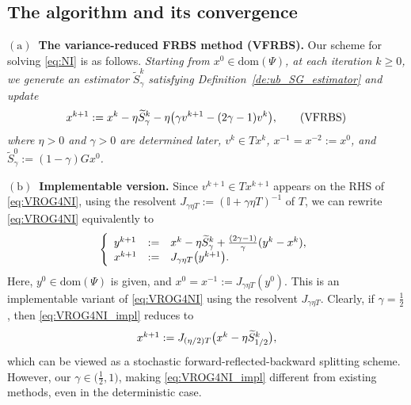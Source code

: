 \documentclass{article}
\newcommand{\Id}{\mathbb{I}}
\newcommand{\dom}[1]{\mathrm{dom}(#1)}
\newcommand{\aftersubsec}{\vspace{-1.5ex}}
\theoremstyle{plain}
\theoremstyle{definition}
\theoremstyle{remark}
\begin{document}
\subsection{The algorithm and its convergence}\label{subsec:VROG4NI_alg_convergence}
\aftersubsec
\vspace{0.5ex}
\textbf{$\mathrm{(a)}$~The variance-reduced FRBS method (VFRBS).}
Our scheme for solving \eqref{eq:NI} is as follows.
\textit{
Starting from $x^0 \in \dom{\Psi}$,  at each iteration $k \geq 0$, we generate an estimator $\widetilde{S}_{\gamma}^k$ satisfying Definition~\ref{de:ub_SG_estimator} and update
\vspace{-0.5ex}
\begin{equation}\label{eq:VROG4NI}
x^{k+1} :=  x^k - \eta  \widetilde{S}_{\gamma}^k - \eta \big( \gamma v^{k+1} - (2\gamma - 1)v^k \big),
\tag{VFRBS}
\vspace{-0.5ex}
\end{equation}
where $\eta > 0$ and $\gamma > 0$  are determined later, $v^k \in Tx^k$,  $x^{-1} = x^{-2} := x^0$, and $\widetilde{S}_{\gamma}^0 := (1-\gamma)Gx^0$.
}

\textbf{$\mathrm{(b)}$~Implementable version.}
Since $v^{k+1} \in Tx^{k+1}$ appears on the RHS of \eqref{eq:VROG4NI}, using the resolvent  $J_{\gamma\eta T} := (\Id + \gamma\eta T)^{-1}$ of $T$, we can rewrite \eqref{eq:VROG4NI} equivalently to  
\vspace{-1ex}
\begin{equation}\label{eq:VROG4NI_impl}
\left\{\begin{array}{lcl}
y^{k+1} &:= & x^k - \eta  \widetilde{S}_{\gamma}^k + \frac{(2\gamma - 1)}{\gamma}(y^k - x^k), \\
x^{k+1} &:= &  J_{\gamma\eta T}\big( y^{k+1}\big). 
\end{array}\right.
\vspace{-1ex}
\end{equation}
Here, $y^0 \in \dom{\Psi}$ is given, and $x^0 = x^{-1} := J_{\gamma\eta T}(y^0)$.
This is an implementable variant of \eqref{eq:VROG4NI} using the resolvent $J_{\gamma\eta T}$.
Clearly, if $\gamma = \frac{1}{2}$, then \eqref{eq:VROG4NI_impl} reduces to 
\vspace{-0.5ex}
\begin{equation*} 
\begin{array}{lcl}
x^{k+1} :=   J_{(\eta/2) T}\big( x^k - \eta  \widetilde{S}_{1/2}^k \big),
\end{array}
\vspace{-0.5ex}
\end{equation*}
which can be viewed as a stochastic forward-reflected-backward splitting scheme.
However, our $\gamma \in \big(\frac{1}{2}, 1)$, making \eqref{eq:VROG4NI_impl} different from existing methods, even in the deterministic case.
\end{document}
